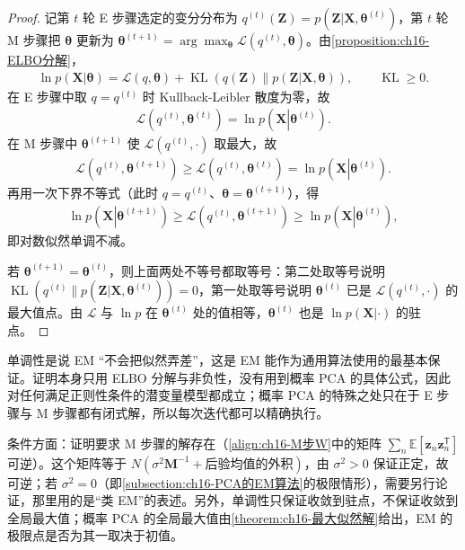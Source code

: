 \documentclass[../../main.tex]{subfiles}
\begin{document}
\begin{proof}
记第 $t$ 轮 E 步骤选定的变分分布为 $q^{(t)}(\bm{Z})=p(\bm{Z}|\bm{X},\bm{\theta}^{(t)})$，第 $t$ 轮 M 步骤把 $\bm{\theta}$ 更新为 $\bm{\theta}^{(t+1)}=\arg\max_{\bm{\theta}}\mathcal{L}(q^{(t)},\bm{\theta})$。由\cref{proposition:ch16-ELBO分解}，
\begin{align*}
  \ln p(\bm{X}|\bm{\theta})=\mathcal{L}(q,\bm{\theta})+\operatorname{KL}\left(q(\bm{Z})\|p(\bm{Z}|\bm{X},\bm{\theta})\right),\qquad \operatorname{KL}\geqslant0.
\end{align*}
在 E 步骤中取 $q=q^{(t)}$ 时 Kullback-Leibler 散度为零，故
\begin{align*}
  \mathcal{L}\left(q^{(t)},\bm{\theta}^{(t)}\right)=\ln p\left(\bm{X}\left|\bm{\theta}^{(t)}\right.\right).
\end{align*}
在 M 步骤中 $\bm{\theta}^{(t+1)}$ 使 $\mathcal{L}(q^{(t)},\cdot)$ 取最大，故
\begin{align*}
  \mathcal{L}\left(q^{(t)},\bm{\theta}^{(t+1)}\right)\geqslant\mathcal{L}\left(q^{(t)},\bm{\theta}^{(t)}\right)=\ln p\left(\bm{X}\left|\bm{\theta}^{(t)}\right.\right).
\end{align*}
再用一次下界不等式（此时 $q=q^{(t)}$、$\bm{\theta}=\bm{\theta}^{(t+1)}$），得
\begin{align*}
  \ln p\left(\bm{X}\left|\bm{\theta}^{(t+1)}\right.\right)\geqslant\mathcal{L}\left(q^{(t)},\bm{\theta}^{(t+1)}\right)\geqslant\ln p\left(\bm{X}\left|\bm{\theta}^{(t)}\right.\right),
\end{align*}
即对数似然单调不减。

若 $\bm{\theta}^{(t+1)}=\bm{\theta}^{(t)}$，则上面两处不等号都取等号：第二处取等号说明 $\operatorname{KL}(q^{(t)}\|p(\bm{Z}|\bm{X},\bm{\theta}^{(t)}))=0$，第一处取等号说明 $\bm{\theta}^{(t)}$ 已是 $\mathcal{L}(q^{(t)},\cdot)$ 的最大值点。由 $\mathcal{L}$ 与 $\ln p$ 在 $\bm{\theta}^{(t)}$ 处的值相等，$\bm{\theta}^{(t)}$ 也是 $\ln p(\bm{X}|\cdot)$ 的驻点。
\end{proof}

\begin{remark}
单调性是说 EM “不会把似然弄差”，这是 EM 能作为通用算法使用的最基本保证。证明本身只用 ELBO 分解与非负性，没有用到概率 PCA 的具体公式，因此对任何满足正则性条件的潜变量模型都成立；概率 PCA 的特殊之处只在于 E 步骤与 M 步骤都有闭式解，所以每次迭代都可以精确执行。

条件方面：证明要求 M 步骤的解存在（\eqref{align:ch16-M步W}中的矩阵 $\sum_n\mathbb{E}[\bm{z}_n\bm{z}_n^{\mathsf T}]$ 可逆）。这个矩阵等于 $N(\sigma^2\bm{M}^{-1}+\text{后验均值的外积})$，由 $\sigma^2>0$ 保证正定，故可逆；若 $\sigma^2=0$（即\cref{subsection:ch16-PCA的EM算法}的极限情形），需要另行论证，那里用的是“类 EM”的表述。另外，单调性只保证收敛到驻点，不保证收敛到全局最大值；概率 PCA 的全局最大值由\cref{theorem:ch16-最大似然解}给出，EM 的极限点是否为其一取决于初值。
\end{remark}
\end{document}

